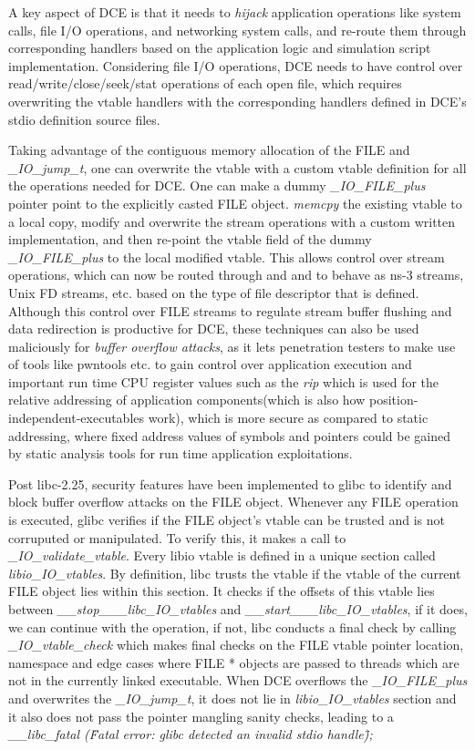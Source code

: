 \documentclass{sig-alternate}
\begin{document}
A key aspect of DCE is that it needs to \textit{hijack}
application operations like system calls, file I/O operations, and networking
system calls, and re-route them through 
corresponding handlers based on the application logic and simulation script implementation. Considering file I/O operations, DCE needs to have control 
over read/write/close/seek/stat operations of each open file, which requires
overwriting the vtable handlers with the corresponding handlers defined 
in DCE's stdio definition source files. 

Taking advantage of the contiguous memory allocation of the FILE and \textit{\_IO\_jump\_t}, one can overwrite the vtable with a custom vtable definition for all the operations needed for DCE. One can make a dummy \textit{\_IO\_FILE\_plus} 
pointer point to the explicitly casted FILE object. \textit{memcpy} the existing vtable to a local copy, modify and overwrite the stream operations with a 
custom written implementation, and then re-point the vtable field of the dummy \textit{\_IO\_FILE\_plus} to the local modified vtable.  This allows
control over stream operations, which can now be routed through and and to behave as ns-3 streams, Unix FD streams, etc. based on the type of file 
descriptor that is defined.  Although this control over FILE streams
to regulate stream buffer flushing and data redirection is productive for
DCE, these techniques can also be used maliciously for
\textit{buffer overflow attacks}, as it lets penetration 
testers to make use of tools like pwntools etc. to gain control over application execution and important run time CPU register values such as the 
\textit{rip} which is used for the relative addressing of application components(which is also how position-independent-executables work), which is more 
secure as compared to static addressing, where fixed address values of symbols and pointers could be gained by static analysis tools for run 
time application exploitations.

Post libc-2.25, security features have been implemented to glibc to identify 
and block buffer overflow attacks on the FILE object. Whenever any FILE
operation is executed, glibc 
verifies if the FILE object's vtable can be trusted and is not corruputed or manipulated. To verify this, it makes a call to 
\textit{\_IO\_validate\_vtable}. Every libio vtable is defined in a unique section called \textit{libio\_IO\_vtables}. By definition, libc trusts
the vtable if the vtable of the current FILE object lies within this section. It checks if the offsets of this vtable lies between 
\textit{\_\_stop\_\_\_libc\_IO\_vtables} and \textit{\_\_start\_\_\_libc\_IO\_vtables}, if it does, we can continue with the operation, if not, libc 
conducts a final check by calling \textit{\_IO\_vtable\_check} which makes final checks on the FILE vtable pointer location, namespace and edge cases
where FILE * objects are passed to threads which are not in the currently linked executable.  When DCE overflows the \textit{\_IO\_FILE\_plus} and 
overwrites the \textit{\_IO\_jump\_t}, it does not lie in \textit{libio\_IO\_vtables} section and it also does not pass the pointer mangling sanity checks, leading to a \textit{\_\_libc\_fatal (\"Fatal error: glibc detected an invalid stdio handle\");}
\end{document}
